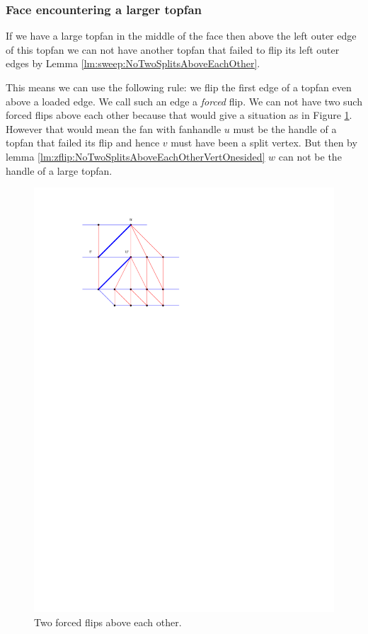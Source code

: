 \subsubsection{Face encountering a larger topfan}
  If we have a large topfan in the middle of the face then above the left outer edge of this topfan we can not have another topfan that failed to flip its left outer edges by Lemma \ref{lm:sweep:NoTwoSplitsAboveEachOther}.

  This means we can use the following rule: we flip the first edge of a topfan even above a loaded edge.
  We call such an edge a \emph{forced} flip. We can not have two such forced flips above each other because that would give a situation as in Figure \ref{fig:subdiv:forcedFlips}.
  However that would mean the fan with fanhandle $u$ must be the handle of a topfan that failed its flip and hence $v$ must have been a split vertex. But then by lemma \ref{lm:zflip:NoTwoSplitsAboveEachOtherVertOnesided} $w$ can not be the handle of a large topfan.

  \begin{figure}[h]
    \centering
    \includegraphics[scale=1]{blueFaceSubdivision/img/forcedFlips.pdf}
    \caption{Two forced flips above each other.}
    \label{fig:subdiv:forcedFlips}
  \end{figure}

